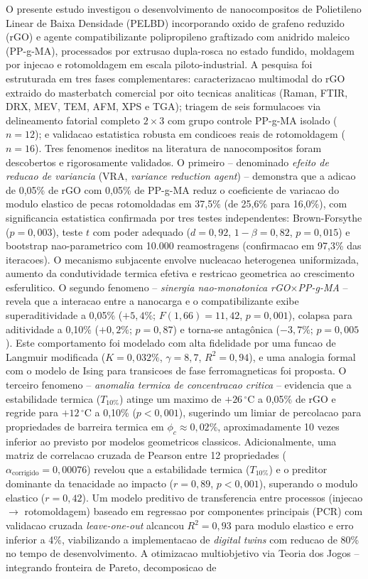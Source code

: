 \documentclass[11pt,a4paper,oneside]{article}
\begin{document}
O presente estudo investigou o desenvolvimento de nanocompositos de Polietileno Linear de Baixa Densidade (PELBD) incorporando oxido de grafeno reduzido (rGO) e agente compatibilizante polipropileno graftizado com anidrido maleico (PP-g-MA), processados por extrusao dupla-rosca no estado fundido, moldagem por injecao e rotomoldagem em escala piloto-industrial. A pesquisa foi estruturada em tres fases complementares: caracterizacao multimodal do rGO extraido do masterbatch comercial por oito tecnicas analiticas (Raman, FTIR, DRX, MEV, TEM, AFM, XPS e TGA); triagem de seis formulacoes via delineamento fatorial completo $2{\times}3$ com grupo controle PP-g-MA isolado ($n{=}12$); e validacao estatistica robusta em condicoes reais de rotomoldagem ($n{=}16$). Tres fenomenos ineditos na literatura de nanocompositos foram descobertos e rigorosamente validados. O primeiro -- denominado \textit{efeito de reducao de variancia} (VRA, \textit{variance reduction agent}) -- demonstra que a adicao de 0,05\% de rGO com 0,05\% de PP-g-MA reduz o coeficiente de variacao do modulo elastico de pecas rotomoldadas em 37,5\% (de 25,6\% para 16,0\%), com significancia estatistica confirmada por tres testes independentes: Brown-Forsythe ($p{=}0{,}003$), teste $t$ com poder adequado ($d{=}0{,}92$, $1{-}\beta{=}0{,}82$, $p{=}0{,}015$) e bootstrap nao-parametrico com 10.000 reamostragens (confirmacao em 97,3\% das iteracoes). O mecanismo subjacente envolve nucleacao heterogenea uniformizada, aumento da condutividade termica efetiva e restricao geometrica ao crescimento esferulitico. O segundo fenomeno -- \textit{sinergia nao-monotonica rGO$\times$PP-g-MA} -- revela que a interacao entre a nanocarga e o compatibilizante exibe superaditividade a 0,05\% ($+5{,}4\%$; $F(1{,}66){=}11{,}42$, $p{=}0{,}001$), colapsa para aditividade a 0,10\% ($+0{,}2\%$; $p{=}0{,}87$) e torna-se antagônica ($-3{,}7\%$; $p{=}0{,}005$). Este comportamento foi modelado com alta fidelidade por uma funcao de Langmuir modificada ($K{=}0{,}032\%$, $\gamma{=}8{,}7$, $R^2{=}0{,}94$), e uma analogia formal com o modelo de Ising para transicoes de fase ferromagneticas foi proposta. O terceiro fenomeno -- \textit{anomalia termica de concentracao critica} -- evidencia que a estabilidade termica ($T_{10\%}$) atinge um maximo de $+26\,^{\circ}$C a 0,05\% de rGO e regride para $+12\,^{\circ}$C a 0,10\% ($p{<}0{,}001$), sugerindo um limiar de percolacao para propriedades de barreira termica em $\phi_c{\approx}0{,}02\%$, aproximadamente 10 vezes inferior ao previsto por modelos geometricos classicos. Adicionalmente, uma matriz de correlacao cruzada de Pearson entre 12 propriedades ($\alpha_{\text{corrigido}}{=}0{,}00076$) revelou que a estabilidade termica ($T_{10\%}$) e o preditor dominante da tenacidade ao impacto ($r{=}0{,}89$, $p{<}0{,}001$), superando o modulo elastico ($r{=}0{,}42$). Um modelo preditivo de transferencia entre processos (injecao $\rightarrow$ rotomoldagem) baseado em regressao por componentes principais (PCR) com validacao cruzada \textit{leave-one-out} alcancou $R^2{=}0{,}93$ para modulo elastico e erro inferior a 4\%, viabilizando a implementacao de \textit{digital twins} com reducao de 80\% no tempo de desenvolvimento. A otimizacao multiobjetivo via Teoria dos Jogos -- integrando fronteira de Pareto, decomposicao de 
\end{document}
